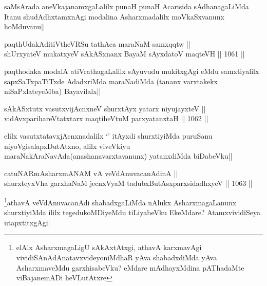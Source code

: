 \begin{artha}
saMsArada aneVkajanamxgaLalilx punaH punaH Acarisida sAdhanagaLiMda Itanu shudAdhxtamxnAgi modalina Asharxmadalilx moVkaSxvanunx hoMduvanu||
\end{artha}


\begin{shl}
paqthUdakAditiVtheVRSu tathAca maraNaM samxqqtw || \\
shUrxyateV mukatxyeV sAkASxnanx BayaM sAyxdatoV maqteVH ||  1061 ||  
\end{shl}

\begin{artha}
paqthodaka modalA atiVrathagaLalilx sAyuvudu mukitxgAgi eMdu samxtiyalilx sapxSaTxpaTiTxde AdadxriMda maraNadiMda (tananx varxtakekx niSaPxlateyeMba) Bayavilalx||
\end{artha}

\begin{shl}
sAkASxtutx vasutxvijAcnxneV shurxtAyx yatarx niyujayxteV || \\
vidAvxparihareVtatxtarx maqtiheVtuM parxyatanxtaH ||  1062 ||  
\end{shl}

\begin{artha}
elilx vasutxtatavxjAcnxnadalilx `\stext' itAyxdi shurxtiyiMda puruSanu niyoVgisalapxDutAtxno, alilx viveVkiyu maraNakAraNavAda(anashanavarxtavanunx) yatanxdiMda biDabeVku||
\end{artha}


\begin{shl}
catuNARmAsharxmANAM vA veVdAnuvacanAdinA || \\
shurxteyxVha garxhaNaM jecnxVyaM tadubxButAsxparxsidadhxyeV ||  1063 ||  
\end{shl}

\begin{artha}
\footnote{elAlx AsharxmagaLigU sAkAxtAtxgi, athavA karxmavAgi vividiSAnAdAnatavxvideyoniMdhaR yAva shabadxdiMda yAva AsharxmaveMdu garxhisabeVku? eMdare mAdhayxMdina pAThadaMte viBajanemADi heVLutAtxre}athavA veVdAnuvacanAdi shabadxgaLiMda nAlukx AsharxmagaLanunx shurxtiyiMda ililx tegedukoMDiyeMdu tiLiyabeVku EkeMdare? AtamxvividiSeya utapxtitxgAgi|
\end{artha}


